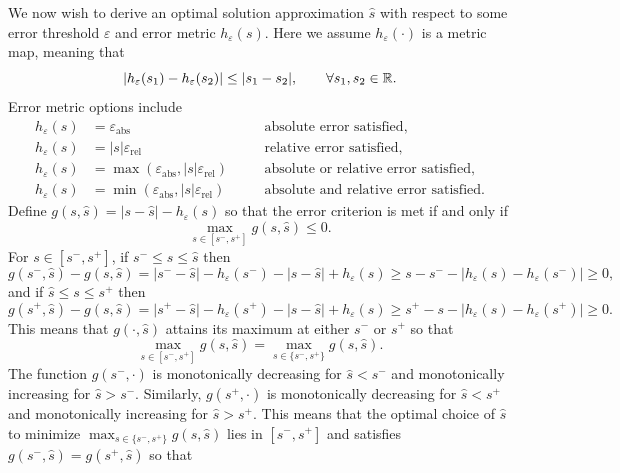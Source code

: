 \documentclass{article}[12pt]
\newcommand{\varepsabs}{\varepsilon_\text{abs}}
\newcommand{\varepsrel}{\varepsilon_\text{rel}}
\begin{document}
We now wish to derive an optimal solution approximation $\hat{s}$ with respect to some error threshold $\varepsilon$ and  error metric $h_\varepsilon(s)$. Here we assume $h_\varepsilon(\cdot)$ is a metric map, meaning that
$$\lvert h_\varepsilon(s_1) - h_\varepsilon(s_2) \rvert \leq \lvert s_1 - s_2 \rvert, \qquad \forall s_1,s_2 \in \mathbb{R}.$$
Error metric options include
\begin{subequations}
\begin{align}
    h_\varepsilon(s) &= \varepsabs \quad &&\text{absolute error satisfied}, \label{eq:h_abs} \\
    h_\varepsilon(s) &= \lvert s \rvert \varepsrel \quad &&\text{relative error satisfied}, \label{eq:h_rel} \\
    h_\varepsilon(s) &= \max\left(\varepsabs,\lvert s \rvert \varepsrel \right) \quad &&\text{absolute or relative error satisfied}, \label{eq:h_abs_or_rel} \\
    h_\varepsilon(s) &= \min\left(\varepsabs,\lvert s \rvert \varepsrel \right) \quad &&\text{absolute and relative error satisfied.} \label{eq:h_abs_and_rel}
\end{align}
\end{subequations}
Define $g(s,\hat{s})=\lvert s - \hat{s} \rvert -h_\varepsilon(s)$ so that the error criterion is met if and only if 
$$\max_{s \in [s^-,s^+]} g(s,\hat{s}) \leq 0.$$ For $s \in [s^-,s^+]$, if $s^- \leq s \leq \hat{s}$ then 
$$g(s^-,\hat{s})-g(s,\hat{s}) = \lvert s^- - \hat{s} \rvert -h_\varepsilon(s^-) - \lvert s - \hat{s} \rvert  + h_\varepsilon(s) \geq s - s^- - \lvert h_\varepsilon(s)-h_\varepsilon(s^-) \rvert \geq 0,$$
and if $\hat{s} \leq s \leq s^+$ then 
$$g(s^+,\hat{s})-g(s,\hat{s}) = \lvert s^+ - \hat{s} \rvert -h_\varepsilon(s^+) - \lvert s - \hat{s} \rvert  + h_\varepsilon(s) \geq s^+ - s - \lvert h_\varepsilon(s)-h_\varepsilon(s^+) \rvert \geq 0.$$
This means that $g(\cdot,\hat{s})$ attains its maximum at either $s^-$ or $s^+$ so that
\begin{equation*}
    \max_{s \in [s^-,s^+]} g(s,\hat{s}) = \max_{s \in \{s^-,s^+\}} g(s,\hat{s}).
\end{equation*}
The function $g(s^-,\cdot)$ is monotonically decreasing for $\hat{s} < s^-$ and monotonically increasing for $\hat{s} > s^-$. Similarly, $g(s^+,\cdot)$ is monotonically decreasing for $\hat{s} < s^+$ and monotonically increasing for $\hat{s} > s^+$. This means that the optimal choice of $\hat{s}$ to minimize $\max_{s \in \{s^-,s^+\}} g(s,\hat{s})$ lies in $[s^-,s^+]$ and satisfies $g(s^-,\hat{s}) = g(s^+,\hat{s})$ so that 
\end{document}

